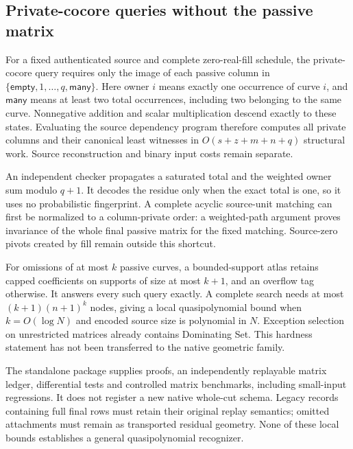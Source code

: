 \subsection{Private-cocore queries without the passive matrix}
For a fixed authenticated source and complete zero-real-fill schedule, the
private-cocore query requires only the image of each passive column in
\(\{\mathsf{empty},1,\ldots,q,\mathsf{many}\}\). Here owner \(i\) means
exactly one occurrence of curve \(i\), and \(\mathsf{many}\) means at least
two total occurrences, including two belonging to the same curve.
Nonnegative addition and scalar multiplication descend exactly to these
states. Evaluating the source dependency program therefore computes all
private columns and their canonical least witnesses in
\(O(s+z+m+n+q)\) structural work. Source reconstruction and binary input
costs remain separate.

An independent checker propagates a saturated total and the weighted owner
sum modulo \(q+1\). It decodes the residue only when the exact total is one,
so it uses no probabilistic fingerprint. A complete acyclic source-unit
matching can first be normalized to a column-private order: a weighted-path
argument proves invariance of the whole final passive matrix for the fixed
matching. Source-zero pivots created by fill remain outside this shortcut.

For omissions of at most \(k\) passive curves, a bounded-support atlas retains
capped coefficients on supports of size at most \(k+1\), and an overflow tag
otherwise. It answers every such query exactly. A complete search needs at
most \((k+1)(n+1)^k\) nodes, giving a local quasipolynomial bound when
\(k=O(\log N)\) and encoded source size is polynomial in \(N\). Exception
selection on unrestricted matrices already contains Dominating Set. This
hardness statement has not been transferred to the native geometric family.

The standalone package supplies proofs, an independently replayable matrix
ledger, differential tests and controlled matrix benchmarks, including
small-input regressions. It does not register a new native whole-cut schema.
Legacy records containing full final rows must retain their original replay
semantics; omitted attachments must remain as transported residual geometry.
None of these local bounds establishes a general quasipolynomial recognizer.
